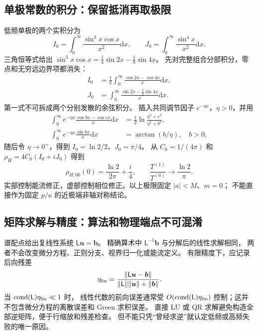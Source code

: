 \documentclass[UTF8,fontset=fandol,11pt,a4paper,oneside]{ctexart}
\numberwithin{equation}{section}
\newcommand{\dd}{\mathrm d}
\begin{document}
\subsection{单极常数的积分：保留抵消再取极限}
低频单极的两个实积分为
\begin{equation}
 I_0=\int_0^\infty\frac{\sin^3x\cos x}{x^2}\dd x,
 \qquad J_0=\int_0^\infty\frac{\sin^4x}{x^2}\dd x.
\end{equation}
三角恒等式给出 $\sin^3x\cos x=\frac14\sin2x-\frac18\sin4x$。
先对完整组合分部积分，零点和无穷远边界项都消失：
\begin{align}
 I_0&=\frac12\int_0^\infty\frac{\cos2x-\cos4x}{x}\dd x,\\
 J_0&=\int_0^\infty\frac{\sin2x-\frac12\sin4x}{x}\dd x.
\end{align}
第一式不可拆成两个分别发散的余弦积分。
插入共同调节因子 $e^{-\eta x}$，$\eta>0$，并用
\begin{align}
 \int_0^\infty e^{-\eta x}\frac{\cos bx-\cos cx}{x}\dd x
 &=\frac12\ln\frac{\eta^2+c^2}{\eta^2+b^2},\\
 \int_0^\infty e^{-\eta x}\frac{\sin bx}{x}\dd x
 &=\arctan(b/\eta),\quad b>0,
\end{align}
随后令 $\eta\to0^+$，得到 $I_0=\ln2/2$、$J_0=\pi/4$。
从 $C_0=1/(4\pi)$ 和 $\rho_H=4C_0(I_0+iJ_0)$ 得到
\begin{equation}
 \rho_{H,00}(0)=\frac{\ln2}{2\pi}+\frac i4,
 \qquad \frac{T^{(1)}}{T^{(0)}}\longrightarrow\frac{\ln2}{\pi}.
\end{equation}
实部控制能流修正，虚部控制相位修正。以上极限固定 $|a|<M$、$m=0$；
不能直接作为固定 $p/\kappa$ 的近极端非轴对称结论。

\subsection{矩阵求解与精度：算法和物理端点不可混淆}
谱配点给出复线性系统 $\mathsf L\boldsymbol u=\boldsymbol b$。
精确算术中 $\mathsf L^{-1}\boldsymbol b$ 与分解后的线性求解相同，
两者不会改变微分方程、正则分支、视界归一化或能流定义。
有限精度下，应记录后向残差
\begin{equation}
 \eta_{\rm lin}=
 \frac{\|\mathsf L\boldsymbol u-\boldsymbol b\|}
 {\|\mathsf L\|\|\boldsymbol u\|+\|\boldsymbol b\|}.
\end{equation}
当 $\operatorname{cond}(\mathsf L)\eta_{\rm lin}\ll1$ 时，
线性代数的前向误差通常受 $O(\operatorname{cond}(\mathsf L)\eta_{\rm lin})$
控制；这并不包含微分方程的离散误差和 Green 求积误差。
直接 LU 或 QR 求解避免构造全部逆矩阵，便于行缩放和残差检查。
但不能只凭“曾经求逆”就认定低频或高频失败的唯一原因。
\end{document}
